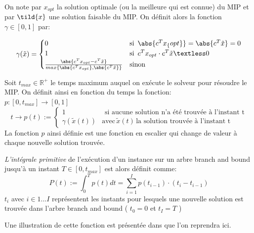 \documentclass[12pt,a4paper,oneside]{book}
\theoremstyle{definition}
\newcommand{\R}{\mathbb{R}}
\begin{document}
	\paragraph{}
	On note par $x_{opt}$ la solution optimale (ou la meilleure qui est connue) du MIP et par $\tild{x}$ une solution faisable du MIP. On définit alors la fonction $\gamma \in [0,1]$ par:
	
	\[
		\gamma(\tilde{x}) = \begin{cases}
			0 & \text{si} \hspace{5pt} \abs{c^T x_\{opt\}} = \abs{c^T \tilde{x}} = 0 \\
			1 & \text{si} \hspace{5pt}  c^T x_{opt} \cdot c^T \tilde{x} \textless 0 \\
			\frac{\abs{c^T x_{opt} - c^T \tilde{x} } }{max\{\abs{c^T x_{opt}}, \abs{c^T \tilde{x}} \} } & \text{sinon}
		\end{cases}
	\]

	Soit $t_{max} \in \R^+$ le temps maximum auquel on exécute le solveur pour résoudre le MIP. On définit ainsi en fonction du temps la fonction:\\
	$p: [0, t_{max}] \rightarrow [0, 1]$
	\[
		t \rightarrow p(t) := \begin{cases}
						 1 & \hspace{5pt} \text{si aucune solution n'a été trouvée à l'instant t} \\
						 \gamma(\tilde{x}(t)) & \text{avec} \hspace{2pt} \tilde{x}(t) \hspace{2pt} \text{la solution trouvée à l'instant t}
			     	   \end{cases} 
	\] 
	La fonction $p$ ainsi définie est une fonction en escalier qui change de valeur à chaque nouvelle solution trouvée. 
	
	\textit{L'intégrale primitive} de l'exécution d'un instance sur un arbre branch and bound jusqu'à un instant $T \in [0,t_{max}] $ est alors définit comme:
	\[
		P(t) := \int_{0}^{T}p(t) dt = \sum_{i=1}^{I} p(t_{i-1}) \cdot (t_i - t_{i-1})
	\]
	$t_i$ avec $i \in {1...I}$ représentent les instants pour lesquels une nouvelle solution est trouvée dans l'arbre branch and bound ( $t_0 = 0 $ et $ t_I = T $ )
	
	Une illustration de cette fonction est présentée dans \cite{Khalil2017} que l'on reprendra ici.
	
\end{document}
